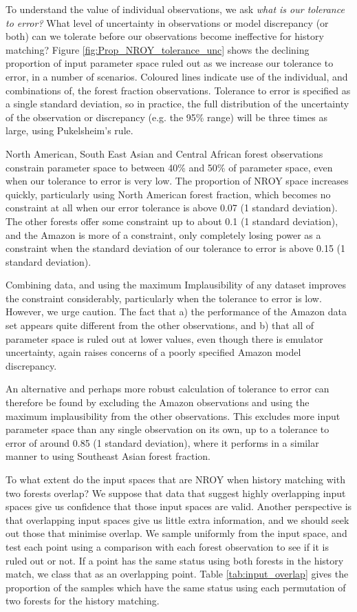 \documentclass[esd, article]{copernicus} %
\begin{document}
To understand the value of individual observations, we ask \emph{what is our tolerance to error?} What level of uncertainty in observations or model discrepancy (or both) can we tolerate before our observations become ineffective for history matching? Figure \ref{fig:Prop_NROY_tolerance_unc} shows the declining proportion of input parameter space ruled out as we increase our tolerance to error, in a number of scenarios. Coloured lines indicate use of the individual, and combinations of, the forest fraction observations. Tolerance to error is specified as a single standard deviation, so in practice, the full distribution of the uncertainty of the observation or discrepancy (e.g. the 95\% range) will be three times as large, using Pukelsheim's rule.

North American, South East Asian and Central African forest observations constrain parameter space to between 40\% and 50\% of parameter space, even when our tolerance to error is very low. The proportion of NROY space increases quickly, particularly using North American forest fraction, which becomes no constraint at all when our error tolerance is above 0.07 (1 standard deviation). The other forests offer some constraint up to about 0.1 (1 standard deviation), and the Amazon is more of a constraint, only completely losing power as a constraint when the standard deviation of our tolerance to error is above 0.15 (1 standard deviation).

Combining data, and using the maximum Implausibility of any dataset improves the constraint considerably, particularly when the tolerance to error is low. However, we urge caution. The fact that a) the performance of the Amazon data set appears quite different from the other observations, and b) that all of parameter space is ruled out at lower values, even though there is emulator uncertainty, again raises concerns of a poorly specified Amazon model discrepancy. 

An alternative and perhaps more robust calculation of tolerance to error can therefore be found by excluding the Amazon observations and using the maximum implausibility from the other observations. This excludes more input parameter space than any single observation on its own, up to a tolerance to error of around 0.85 (1 standard deviation), where it performs in a similar manner to using Southeast Asian forest fraction.
 

To what extent do the input spaces that are NROY when history matching with two forests overlap? We suppose that data that suggest highly overlapping input spaces give us confidence that those input spaces are valid. Another perspective is that overlapping input spaces give us little extra information, and we should seek out those that minimise overlap. We sample uniformly from the input space, and test each point using a comparison with each forest observation to see if it is ruled out or not. If a point has the same status using both forests in the history match, we class that as an overlapping point. Table \ref{tab:input_overlap} gives the proportion of the samples which have the same status using each permutation of two forests for the history matching.
\end{document}
